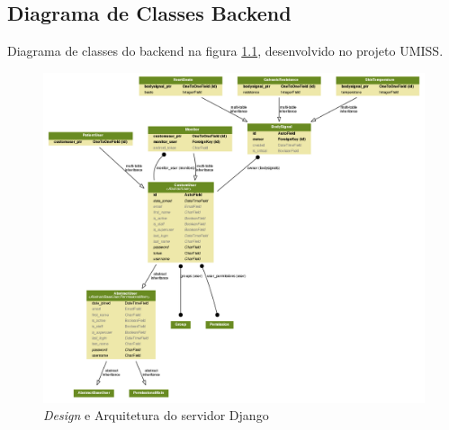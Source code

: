 \begin{anexosenv}

  \partanexos

  \chapter{Diagrama de Classes Backend}
  \label{anx:server_uml}
  Diagrama de classes do backend na figura \ref{fig:server_uml}, desenvolvido no projeto UMISS.
  \begin{figure}[!h]
    \centering
    \includegraphics[width=\textwidth, angle=90]{figuras/server_uml.png}
    \caption{\textit{Design} e Arquitetura do servidor Django}
    \label{fig:server_uml}
  \end{figure}

\end{anexosenv}
